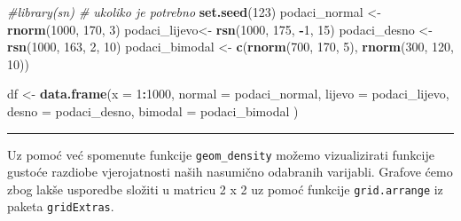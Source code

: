 \documentclass[]{book}
\newenvironment{Shaded}{\begin{snugshade}}{\end{snugshade}}
\newcommand{\KeywordTok}[1]{\textcolor[rgb]{0.13,0.29,0.53}{\textbf{#1}}}
\newcommand{\DataTypeTok}[1]{\textcolor[rgb]{0.13,0.29,0.53}{#1}}
\newcommand{\DecValTok}[1]{\textcolor[rgb]{0.00,0.00,0.81}{#1}}
\newcommand{\StringTok}[1]{\textcolor[rgb]{0.31,0.60,0.02}{#1}}
\newcommand{\CommentTok}[1]{\textcolor[rgb]{0.56,0.35,0.01}{\textit{#1}}}
\newcommand{\OperatorTok}[1]{\textcolor[rgb]{0.81,0.36,0.00}{\textbf{#1}}}
\newcommand{\NormalTok}[1]{#1}
\theoremstyle{definition}
\theoremstyle{definition}
\theoremstyle{definition}
\theoremstyle{remark}
\begin{document}
\begin{Shaded}
\begin{Highlighting}[]
\CommentTok{#library(sn)    # ukoliko je potrebno}
\KeywordTok{set.seed}\NormalTok{(}\DecValTok{123}\NormalTok{)}
\NormalTok{podaci_normal <-}\StringTok{ }\KeywordTok{rnorm}\NormalTok{(}\DecValTok{1000}\NormalTok{, }\DecValTok{170}\NormalTok{, }\DecValTok{3}\NormalTok{)}
\NormalTok{podaci_lijevo<-}\StringTok{ }\KeywordTok{rsn}\NormalTok{(}\DecValTok{1000}\NormalTok{, }\DecValTok{175}\NormalTok{, }\OperatorTok{-}\DecValTok{1}\NormalTok{, }\DecValTok{15}\NormalTok{)}
\NormalTok{podaci_desno <-}\StringTok{ }\KeywordTok{rsn}\NormalTok{(}\DecValTok{1000}\NormalTok{, }\DecValTok{163}\NormalTok{, }\DecValTok{2}\NormalTok{, }\DecValTok{10}\NormalTok{)}
\NormalTok{podaci_bimodal <-}\StringTok{ }\KeywordTok{c}\NormalTok{(}\KeywordTok{rnorm}\NormalTok{(}\DecValTok{700}\NormalTok{, }\DecValTok{170}\NormalTok{, }\DecValTok{5}\NormalTok{), }\KeywordTok{rnorm}\NormalTok{(}\DecValTok{300}\NormalTok{, }\DecValTok{120}\NormalTok{, }\DecValTok{10}\NormalTok{))}

\NormalTok{df <-}\StringTok{ }\KeywordTok{data.frame}\NormalTok{(}\DataTypeTok{x =} \DecValTok{1}\OperatorTok{:}\DecValTok{1000}\NormalTok{, }\DataTypeTok{normal =}\NormalTok{ podaci_normal, }\DataTypeTok{lijevo =}\NormalTok{ podaci_lijevo, }
                 \DataTypeTok{desno =}\NormalTok{ podaci_desno, }\DataTypeTok{bimodal =}\NormalTok{ podaci_bimodal )}
\end{Highlighting}
\end{Shaded}

\begin{center}\rule{0.5\linewidth}{\linethickness}\end{center}

Uz pomoć već spomenute funkcije \texttt{geom\_density} možemo
vizualizirati funkcije gustoće razdiobe vjerojatnosti naših nasumično
odabranih varijabli. Grafove ćemo zbog lakše usporedbe složiti u matricu
2 x 2 uz pomoć funkcije \texttt{grid.arrange} iz paketa
\texttt{gridExtras}.
\end{document}

